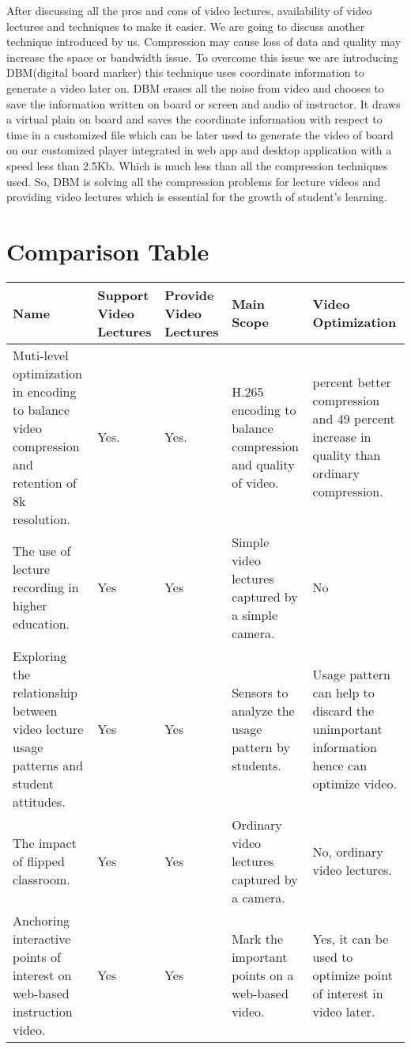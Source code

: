 After discussing all the pros and cons of video lectures, availability of video lectures and techniques to make it easier. We are going to discuss another technique introduced by us. Compression may cause loss of data and quality may increase the space or bandwidth issue. To overcome this issue we are introducing DBM(digital board marker) this technique uses coordinate information to generate a video later on. DBM erases all the noise from video and chooses to save the information written on board or screen and audio of instructor. It draws a virtual plain on board and saves the coordinate information with respect to time in a customized file which can be later used to generate the video of board on our customized player integrated in web app and desktop application with a speed less than 2.5Kb. Which is much less than all the compression techniques used. So, DBM is solving all the compression problems for lecture videos and providing video lectures which is essential for the growth of student's learning.
 

 
\section{Comparison Table}

\begin{sideways}
\centering
\begin{tabularx}{1.5\textwidth} { 
  | >{\raggedright\arraybackslash}X 
  | >{\centering\arraybackslash}X | >{\centering\arraybackslash}X | >{\centering\arraybackslash}X | >{\centering\arraybackslash}X | }
 \hline
\bfseries{Name} & \bfseries{Support Video Lectures} &\bfseries{Provide Video Lectures} &\bfseries{Main Scope} & \bfseries{Video Optimization}  \\
\hline
Muti-level optimization in encoding to balance video compression and retention of 8k resolution.\cite{Murthy2016}
& Yes.
& Yes.
& H.265 encoding to balance compression and quality of video.
& 59 percent better compression and 49 percent increase in quality than ordinary compression.
\\
\hline
The use of lecture recording in higher education.\cite{OCallaghan2017}
& Yes
& Yes
& Simple video lectures captured by a simple camera.
& No
\\
\hline
Exploring the relationship between video lecture usage patterns and student attitudes.\cite{Giannakos2016}
& Yes
& Yes
& Sensors to analyze the usage pattern by students.
& Usage pattern can help to discard the unimportant information hence can optimize video.
\\
\hline
The impact of flipped classroom.\cite{Lo2019}
& Yes
& Yes
& Ordinary video lectures captured by a camera.
& No, ordinary video lectures.
\\
\hline
Anchoring interactive points of interest on web-based instruction video.\cite{Pimentel2019}
& Yes
& Yes
& Mark the important points on a web-based video.
& Yes, it can be used to optimize point of interest in video later.
\\
\hline
\end{tabularx}
\end{sideways}


